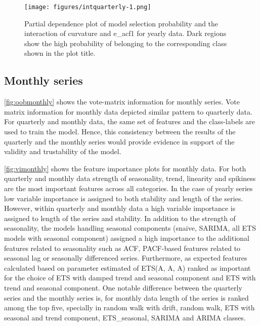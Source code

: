 \documentclass[11pt,a4paper,]{article}
\begin{document}
\begin{figure}
\centering
\texttt{[image: figures/intquarterly-1.png]}
\caption{\label{fig:intquarterly}Partial dependence plot of model selection probability and the interaction of curvature and e\_acf1 for yearly data. Dark regions show the high probability of belonging to the corresponding class shown in the plot title.}
\end{figure}

\hypertarget{monthly-series}{%
\subsection{Monthly series}\label{monthly-series}}

\autoref{fig:oobmonthly} shows the vote-matrix information for monthly series. Vote matrix information for monthly data depicted similar pattern to quarterly data. For quarterly and monthly data, the same set of features and the class-labels are used to train the model. Hence, this consistency between the results of the quarterly and the monthly series would provide evidence in support of the validity and trustability of the model.

\autoref{fig:vimonthly} shows the feature importance plots for monthly data. For both quarterly and monthly data strength of seasonality, trend, linearity and spikiness are the most important features across all categories. In the case of yearly series low variable importance is assigned to both stability and length of the series. However, within quarterly and monthly data a high variable importance is assigned to length of the series and stability. In addition to the strength of seasonality, the models handling seasonal components (snaive, SARIMA, all ETS models with seasonal component) assigned a high importance to the additional features related to seasonality such as ACF, PACF-based features related to seasonal lag or seasonally differenced series. Furthermore, as expected features calculated based on parameter estimated of ETS(A, A, A) ranked as important for the choice of ETS with damped trend and seasonal component and ETS with trend and seasonal component. One notable difference between the quarterly series and the monthly series is, for monthly data length of the series is ranked among the top five, specially in random walk with drift, random walk, ETS with seasonal and trend component, ETS\_seasonal, SARIMA and ARIMA classes.
\end{document}
